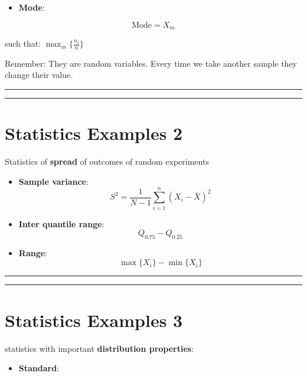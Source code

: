 \documentclass[
]{book}
\providecommand{\tightlist}{%
  \setlength{\itemsep}{0pt}\setlength{\parskip}{0pt}}
\begin{document}
\begin{itemize}
\tightlist
\item
  \textbf{Mode}:
\end{itemize}

\[\text{Mode}= X_{m}\]

such that: \(\max_m\{\frac{n_i}{n}\}\)

Remember: They are random variables. Every time we take another sample they change their value.

\begin{center}\rule{0.5\linewidth}{0.5pt}\end{center}

\begin{center}\rule{0.5\linewidth}{0.5pt}\end{center}

\hypertarget{statistics-examples-2}{%
\section{Statistics Examples 2}\label{statistics-examples-2}}

Statistics of \textbf{spread} of outcomes of random experiments

\begin{itemize}
\item
  \textbf{Sample variance}:
  \[S^2=\frac{1}{N-1}\sum_{i=1}^n (X_i-\bar{X})^2\]
\item
  \textbf{Inter quantile range}:
  \[Q_{0.75}-Q_{0.25}\]
\item
  \textbf{Range}:
  \[\max\{X_i\}-\min\{X_i\}\]
\end{itemize}

\begin{center}\rule{0.5\linewidth}{0.5pt}\end{center}

\begin{center}\rule{0.5\linewidth}{0.5pt}\end{center}

\hypertarget{statistics-examples-3}{%
\section{Statistics Examples 3}\label{statistics-examples-3}}

statistics with important \textbf{distribution properties}:

\begin{itemize}
\tightlist
\item
  \textbf{Standard}:
\end{itemize}
\end{document}
